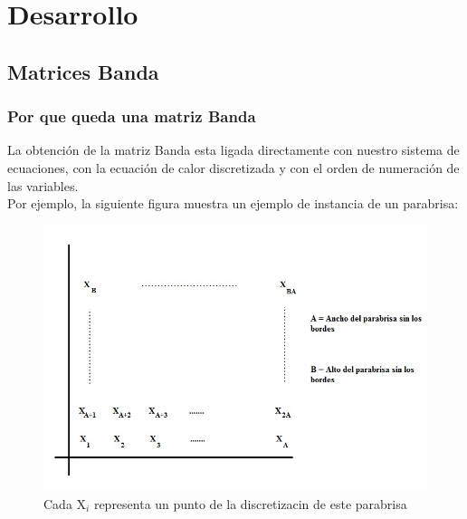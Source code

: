 \section{Desarrollo}

\subsection{Matrices Banda}

\subsubsection{Por que queda una matriz Banda}
La obtención de la matriz Banda esta ligada directamente con nuestro sistema de ecuaciones, con la ecuación de calor discretizada y con el orden de numeración de las variables. \\
Por ejemplo, la siguiente figura  muestra un ejemplo de instancia de un parabrisa:

    \begin{figure}[H]
    \centering
    \includegraphics[scale=0.7]{graphs/mapa.jpg}\caption{Cada X$_i$ representa un punto de la discretizacin de este parabrisa}
      \end{figure}
      
